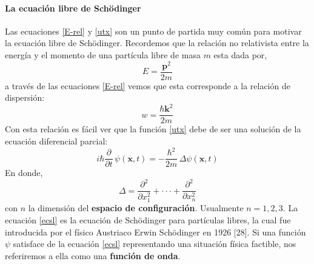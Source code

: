 \documentclass[12pt]{book}
\numberwithin{equation}{chapter}
\def\x{\mathbf{x}}
\def\k{\mathbf{k}}
\def\P{\mathbf{p}}
\begin{document}
\paragraph{La ecuaci\'on libre de Sch\"odinger}
Las ecuaciones \eqref{E-rel} y \eqref{utx} son un punto de partida muy com\'un para motivar la ecuaci\'on libre de Sch\"odinger. Recordemos que la relaci\'on no relativista entre la energ\'ia y el momento de una part\'icula libre de masa $m$ esta dada por, 
\begin{equation}
E= \frac{\P^{2}}{2m}
\end{equation}
a trav\'es de las ecuaciones \eqref{E-rel} vemos que esta corresponde a la relaci\'on de dispersi\'on:
\begin{equation}
w= \frac{\hbar \k^{2}}{2m}
\end{equation}
Con esta relaci\'on es f\'acil ver que la funci\'on \eqref{utx} debe de ser una soluci\'on de la ecuaci\'on diferencial parcial:
\begin{equation}\label{ecsl}
i \hbar \frac{\partial }{\partial t}\, \psi (\x , t)= - \frac{\hbar^{2}}{2m}\, \Delta \psi (\x , t)
\end{equation}
En donde, 
$$ \Delta = \frac{\partial^{2}}{\partial x_{1}^{2}} + \cdot \cdot \cdot + \frac{\partial^{2}}{\partial x_{n}^{2}}$$
con $n$ la dimensi\'on del {\bf espacio de configuraci\'on}. Usualmente $n= 1,2,3$. La ecuaci\'on \eqref{ecsl} es la ecuaci\'on de Sch\"odinger para part\'iculas libres, la cual fue introducida por el f\'isico Austriaco Erwin Sch\"odinger en 1926 [28]. Si una funci\'on $\psi$ satisface de la ecuaci\'on \eqref{ecsl} representando una situaci\'on f\'isica factible, nos referiremos a ella como una {\bf funci\'on de onda}. 
\end{document}
